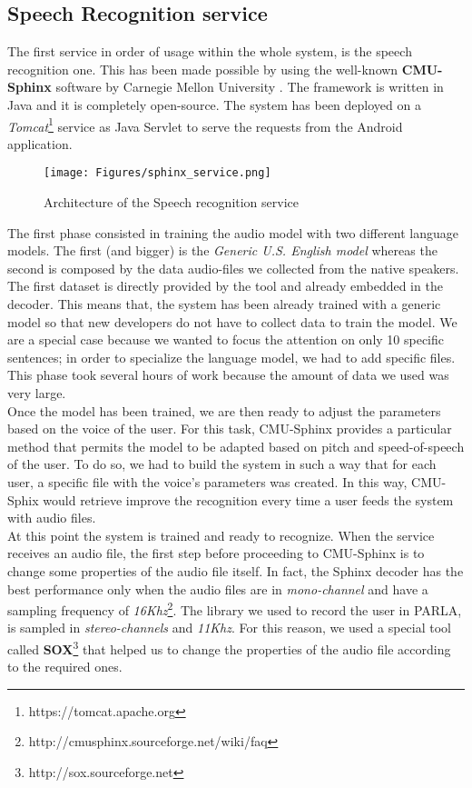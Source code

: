 \subsection{Speech Recognition service}
\label{ssec:training_sr_model}

The first service in order of usage within the whole system, is the speech recognition one. This has been made possible by using the well-known \textbf{CMU-Sphinx} software by Carnegie Mellon University \cite{walker2004sphinx}. The framework is written in Java and it is completely open-source. The system has been deployed on a \textit{Tomcat}\footnote{https://tomcat.apache.org} service as Java Servlet to serve the requests from the Android application. \\

\begin{figure}[!ht]
	\centering
	\texttt{[image: Figures/sphinx\_service.png]}
	\caption{Architecture of the Speech recognition service}
	\label{fig:sphinx_service}
\end{figure}

\noindent The first phase consisted in training the audio model with two different language models. The first (and bigger) is the \textit{Generic U.S. English model} whereas the second is composed by the data audio-files we collected from the native speakers. The first dataset is directly provided by the tool and already embedded in the decoder. This means that, the system has been already trained with a generic model so that new developers do not have to collect data to train the model. We are a special case because we wanted to focus the attention on only 10 specific sentences; in order to specialize the language model, we had to add specific files. This phase took several hours of work because the amount of data we used was very large. \\

\noindent Once the model has been trained, we are then ready to adjust the parameters based on the voice of the user. For this task, CMU-Sphinx provides a particular method that permits the model to be adapted based on pitch and speed-of-speech of the user. To do so, we had to build the system in such a way that for each user, a specific file with the voice's parameters was created. In this way, CMU-Sphix would retrieve improve the recognition every time a user feeds the system with audio files. \\

\noindent At this point the system is trained and ready to recognize. When the service receives an audio file, the first step before proceeding to CMU-Sphinx is to change some properties of the audio file itself. In fact, the Sphinx decoder has the best performance only when the audio files are in \textit{mono-channel} and have a sampling frequency of \textit{16Khz}\footnote{http://cmusphinx.sourceforge.net/wiki/faq}. The library we used to record the user in PARLA, is sampled in \textit{stereo-channels} and \textit{11Khz}. For this reason, we used a special tool called \textbf{SOX}\footnote{http://sox.sourceforge.net} that helped us to change the properties of the audio file according to the required ones. \\

